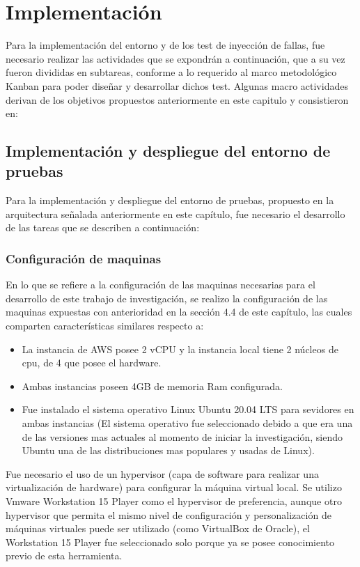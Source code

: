 \section{Implementación}

\par Para la implementación del entorno y de los test de inyección de fallas, fue necesario realizar las actividades que se expondrán a continuación, que a su vez fueron divididas en subtareas, conforme a lo requerido al marco metodológico Kanban para poder diseñar y desarrollar dichos test. Algunas macro actividades derivan de los objetivos propuestos anteriormente en este capitulo y consistieron en:

\subsection{Implementación y despliegue del entorno de pruebas}

\par Para la implementación y despliegue del entorno de pruebas, propuesto en la arquitectura señalada anteriormente en este cap\'itulo, fue necesario el desarrollo de las tareas que se describen a continuación:\\

\subsubsection{Configuración de maquinas}
\par En lo que se refiere a la configuración de las maquinas necesarias para el desarrollo de este trabajo de investigación, se realizo la configuración de las maquinas expuestas con anterioridad en la sección 4.4 de este cap\'itulo, las cuales comparten características similares respecto a:
\begin{itemize}
    \item La instancia de AWS posee 2 vCPU y la instancia local tiene 2 núcleos de cpu, de 4 que posee el hardware.
    \item Ambas instancias poseen 4GB de memoria Ram configurada.
    \item Fue instalado el sistema operativo Linux Ubuntu 20.04 LTS para sevidores en ambas instancias (El sistema operativo fue seleccionado debido a que era una de las versiones mas actuales al momento de iniciar la investigación, siendo Ubuntu una de las distribuciones mas populares y usadas de Linux). 
\end{itemize}
\par Fue necesario el uso de un hypervisor (capa de software para realizar una virtualización de hardware) para configurar la m\'aquina virtual local. Se utilizo Vmware Workstation 15 Player como el hypervisor de preferencia, aunque otro hypervisor que permita el mismo nivel de configuración y personalizaci\'on de máquinas virtuales puede ser utilizado (como VirtualBox de Oracle), el Workstation 15 Player fue seleccionado solo porque  ya se posee conocimiento previo de esta herramienta.\\

